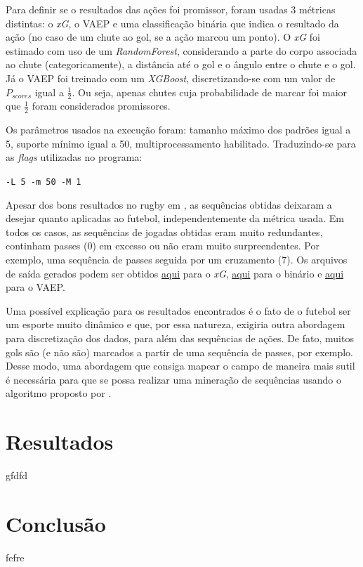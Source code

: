 \documentclass{article}
\begin{document}
Para definir se o resultados das ações foi promissor, foram usadas 3 métricas
distintas: o \textit{xG}, o VAEP e uma classificação binária que indica o
resultado da ação (no caso de um chute ao gol, se a ação marcou um ponto). O
\textit{xG} foi estimado com uso de um \textit{RandomForest}, considerando a
parte do corpo associada ao chute (categoricamente), a distância até o gol e o
ângulo entre o chute e o gol. Já o VAEP foi treinado com um \textit{XGBoost},
discretizando-se com um valor de $P_{scores}$ igual a $\frac{1}{2}$. Ou seja,
apenas chutes cuja probabilidade de marcar foi maior que $\frac{1}{2}$ foram
considerados promissores.

Os parâmetros usados na execução foram: tamanho máximo dos padrões igual a 5,
suporte mínimo igual a 50, multiprocessamento habilitado. Traduzindo-se para as
\textit{flags} utilizadas no programa:

\begin{center}
	\texttt{-L 5 -m 50 -M 1}
\end{center}

Apesar dos bons resultados no rugby em \cite{bunker2021supervised}, as sequências obtidas deixaram a desejar
quanto aplicadas ao futebol, independentemente da métrica usada. Em todos os
casos, as sequências de jogadas obtidas eram muito redundantes, continham passes
(0) em excesso ou não eram muito surpreendentes. Por exemplo, uma sequência de
passes seguida por um cruzamento (7). Os arquivos de saída gerados podem ser
obtidos
\href{https://github.com/lframosferreira/projeto-ad/blob/main/results/supervised-sequential-pattern-rugby/results_xg.csv}{aqui}
para o \textit{xG},
\href{https://github.com/lframosferreira/projeto-ad/blob/main/results/supervised-sequential-pattern-rugby/results_binary.csv}{aqui}
para o binário e
\href{https://github.com/lframosferreira/projeto-ad/blob/main/results/supervised-sequential-pattern-rugby/results_vaep.csv}{aqui}
para o VAEP.

Uma possível explicação para os resultados encontrados é o fato de o futebol ser
um esporte muito dinâmico e que, por essa natureza, exigiria outra abordagem
para discretização dos dados, para além das sequências de ações. De fato, muitos
gols são (e não são) marcados a partir de uma sequência de passes, por exemplo.
Desse modo, uma abordagem que consiga mapear o campo de maneira mais sutil é
necessária para que se possa realizar uma mineração de sequências usando o
algoritmo proposto por \cite{bunker2021supervised}.

\section{Resultados}

gfdfd

\section{Conclusão}

fefre

\newpage

\renewcommand{\refname}{Referências Bibliográficas}

\nocite{*}
\end{document}
